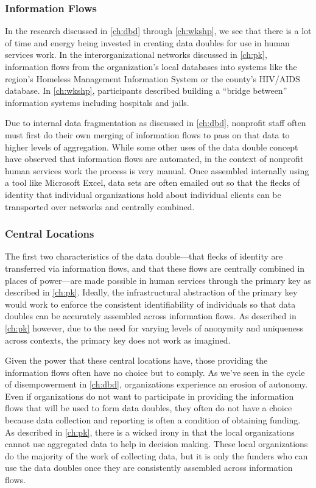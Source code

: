 \subsubsection{Information Flows}
In the research discussed in \autoref{ch:dbd} through \autoref{ch:wkshp}, we see that there is a lot of time and energy being invested in creating data doubles for use in human services work. In the interorganizational networks discussed in \autoref{ch:pk}, information flows from the organization's local databases into systems like the region's Homeless Management Information System or the county's HIV/AIDS database. In \autoref{ch:wkshp}, participants described building a ``bridge between'' information systems including hospitals and jails.

Due to internal data fragmentation as discussed in \autoref{ch:dbd}, nonprofit staff often must first do their own merging of information flows to pass on that data to higher levels of aggregation. While some other uses of the data double concept have observed that information flows are automated, in the context of nonprofit human services work the process is very manual. Once assembled internally using a tool like Microsoft Excel, data sets are often emailed out so that the flecks of identity that individual organizations hold about individual clients can be transported over networks and centrally combined.

\subsubsection{Central Locations}
The first two characteristics of the data double---that flecks of identity are transferred via information flows, and that these flows are centrally combined in places of power---are made possible in human services through the primary key as described in \autoref{ch:pk}. Ideally, the infrastructural abstraction of the primary key would work to enforce the consistent identifiability of individuals so that data doubles can be accurately assembled across information flows. As described in \autoref{ch:pk} however, due to the need for varying levels of anonymity and uniqueness across contexts, the primary key does not work as imagined.

Given the power that these central locations have, those providing the information flows often have no choice but to comply. As we've seen in the cycle of disempowerment in \autoref{ch:dbd}, organizations experience an erosion of autonomy. Even if organizations do not want to participate in providing the information flows that will be used to form data doubles, they often do not have a choice because data collection and reporting is often a condition of obtaining funding. As described in \autoref{ch:pk}, there is a wicked irony in that the local organizations cannot use aggregated data to help in decision making. These local organizations do the majority of the work of collecting data, but it is only the funders who can use the data doubles once they are consistently assembled across information flows.

